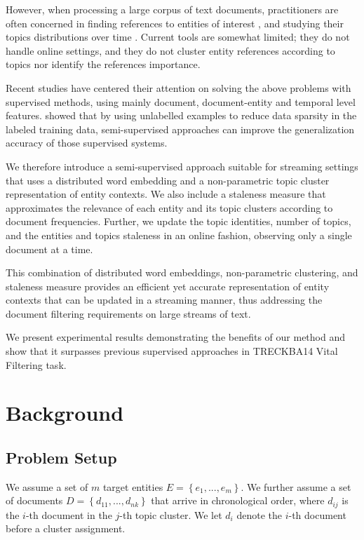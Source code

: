 \documentclass{article}
\begin{document}
However, when processing a large corpus of text documents, practitioners are often concerned in finding references to entities of interest \cite{RaoMD10, choi2007}, and studying their topics distributions over time \cite{blei12}. Current tools are somewhat limited; they do not handle online settings, and they do not cluster entity references according to topics nor identify the references importance.

Recent studies \cite{xitong13, bouvier13, efron13, zhang13, bellogin13} have centered their attention on solving the above problems with supervised methods, using mainly document, document-entity and temporal level features. \citet{Turian10wordrepresentations} showed that by using unlabelled examples to reduce data sparsity in the labeled training data, semi-supervised approaches can improve the generalization accuracy of those supervised systems.

We therefore introduce a semi-supervised approach suitable for streaming settings that uses a distributed word embedding and a non-parametric topic cluster representation of entity contexts. We also include a staleness measure that approximates the relevance of each entity and its topic clusters according to document frequencies. Further, we update the topic identities, number of topics, and the entities and topics staleness in an online fashion, observing only a single document at a time.

This combination of distributed word embeddings, non-parametric clustering, and staleness measure provides an efficient yet accurate representation of entity contexts that can be updated in a streaming manner, thus addressing the document filtering requirements on large streams of text.

We present experimental results demonstrating the benefits of our method and show that it surpasses previous supervised approaches in TRECKBA14 Vital Filtering task.

\section{Background}
\label{background}

\subsection{Problem Setup}
\label{setup}

We assume a set of $m$ target entities $E = \left\{ {e_1, ..., e_m}\right\}$. We further assume a set of documents $D = \left\{ {d_{11}, ..., d_{nk}}\right\}$ that arrive in chronological order, where $d_{ij}$ is the $i$-th document in the $j$-th topic cluster. We let $d_{i}$ denote the $i$-th document before a cluster assignment. 
\end{document}
